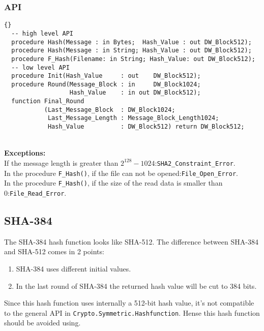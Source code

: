 \subsubsection*{API}
\begin{lstlisting}{}
  -- high level API
  procedure Hash(Message : in Bytes;  Hash_Value : out DW_Block512);
  procedure Hash(Message : in String; Hash_Value : out DW_Block512);
  procedure F_Hash(Filename: in String; Hash_Value: out DW_Block512); 
  -- low level API
  procedure Init(Hash_Value     : out    DW_Block512);
  procedure Round(Message_Block : in     DW_Block1024;
                  Hash_Value    : in out DW_Block512);
  function Final_Round
           (Last_Message_Block  : DW_Block1024;
            Last_Message_Length : Message_Block_Length1024;
            Hash_Value          : DW_Block512) return DW_Block512;
\end{lstlisting}\\
\textbf{Exceptions:}\\
If the message length is greater than $2^{128}-1024$:\quad\texttt{SHA2\_Constraint\_Error}.\\
In the procedure \texttt{F\_Hash()}, if the file can not be opened:\quad\texttt{File\_Open\_Error}.\\
In the procedure \texttt{F\_Hash()}, if the size of the read data is smaller than 0:\quad\texttt{File\_Read\_Error}.\\
\subsection{SHA-384}
The SHA-384 hash function looks like SHA-512. The difference between SHA-384 and SHA-512 comes in 2 points:
\begin{enumerate}
\item SHA-384 uses different initial values.
\item In the last round of SHA-384 the returned hash value will be  cut to 384 bits.
\end{enumerate}
Since this hash function uses internally a 512-bit hash value, it's not compatible to the general API in \texttt{Crypto.Symmetric.Hashfunction}. Hense this hash function should be avoided using.
